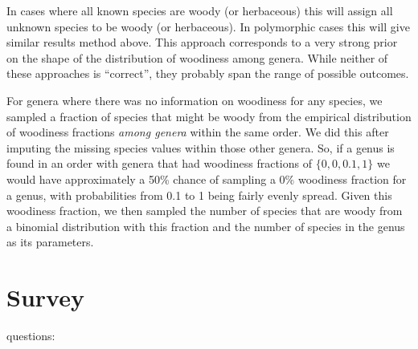 \documentclass[12pt]{article}
\begin{document}
In cases where all known species are woody (or herbaceous) this will
assign all unknown species to be woody (or herbaceous).  In
polymorphic cases this will give similar results method above.  This
approach corresponds to a very strong prior on the shape of the
distribution of woodiness among genera.
While neither of these approaches is ``correct'', they probably
span the range of possible outcomes.

For genera where there was no information on woodiness for any
species, we sampled a fraction of species that might be woody from the
empirical distribution of woodiness fractions \textit{among genera}
within the same order.  We did this after imputing the missing species
values within those other genera.  So, if a genus is found in an order
with genera that had woodiness fractions of $\{0, 0, 0.1, 1\}$ we would
have approximately a 50\% chance of sampling a 0\% woodiness fraction
for a genus, with probabilities from 0.1 to 1 being fairly evenly
spread.  Given this woodiness fraction, we then sampled the number of
species that are woody from a binomial distribution with this fraction
and the number of species in the genus as its parameters.

\section{Survey}
\label{sec:survey}



questions:
\end{document}
